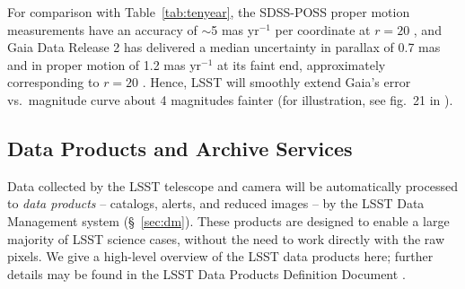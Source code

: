  
For comparison with Table~\ref{tab:tenyear}, the SDSS-POSS proper motion measurements have an
accuracy of $\sim$5 mas yr$^{-1}$ per coordinate at $r=20$ \citep{2004AJ....127.3034M}, and 
Gaia Data Release 2 has delivered a median uncertainty in parallax of 0.7 mas and in proper motion 
of 1.2 mas yr$^{-1}$ at its faint end, approximately corresponding to $r=20$  
\citep{2018A&A...616A...1G,2018A&A...616A...2L}. Hence, LSST will smoothly extend Gaia's error 
vs.\ magnitude curve about 4 magnitudes fainter (for illustration, see fig.~21 in \citealt{2012ARA&A..50..251I}).


\subsection{Data Products and Archive Services }
\label{Sec:dp}

Data collected by the LSST telescope and camera will be automatically processed to \emph{data products} -- catalogs, alerts,
and reduced images -- by the LSST Data Management system
(\S~\ref{sec:dm}). These products are designed to
enable a large majority of LSST science cases, without the need to
work directly with the raw pixels.  We give a high-level overview of
the LSST data products here; further details may be found in the LSST
Data Products Definition Document \citep{LSE-163}.

